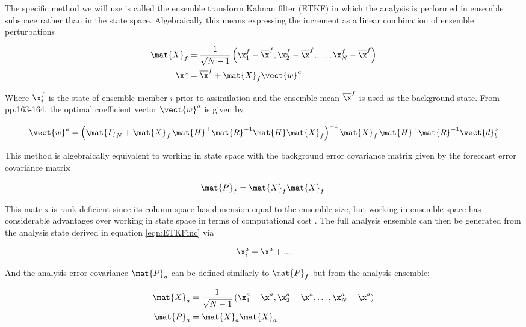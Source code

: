 The specific method we will use is called the ensemble transform Kalman filter (ETKF) in which the analysis is performed in ensemble subspace rather than in the state space. Algebraically this means expressing the increment as a linear combination of ensemble perturbations

\begin{align}
\mat{X}_f &= \frac{1}{\sqrt{N- 1}} \left( \x^f_1 - \overline{\x}^f, \x^f_2 - \overline{\x}^f, \dots, \x^f_N - \overline{\x}^f \right) \\
\x^a &= \overline{\x}^f + \mat{X}_f \vect{w}^a
\end{align}

Where $\x^f_i$ is the state of ensemble member $i$ prior to assimilation and the ensemble mean $\overline{\x}^f$ is used as the background state. From \citet{Asch2016} pp.163-164, the optimal coefficient vector $\vect{w}^a$ is given by

\begin{equation}
\vect{w}^a = \left( \mat{I}_N + \mat{X}_f^\top \mat{H}^\top \mat{R}^{-1} \mat{H} \mat{X}_f \right) ^{-1} \mat{X}_f^\top \mat{H}^\top \mat{R}^{-1} \vect{d}^o_b
\label{eqn:ETKFinc}
\end{equation}

This method is algebraically equivalent to working in state space with the background error covariance matrix given by the foreccast error covariance matrix

\begin{equation}
\mat{P}_f = \mat{X}_f \mat{X}_f^\top
\label{eqn:ferrorcov}
\end{equation}

This matrix is rank deficient since its column space has dimension equal to the ensemble size, but working in ensemble space has considerable advantages over working in state space in terms of computational cost \parencite{Hunt2007}. The full analysis ensemble can then be generated from the analysis state derived in equation \ref{eqn:ETKFinc} via

\begin{equation}
\x^a_i = \x^a + ...
\label{eqn:ETKFens}
\end{equation}

And the analysis error covariance $\mat{P}_a$ can be defined similarly to $\mat{P}_f$ but from the analysis ensemble:

\begin{align}
\mat{X}_a &= \frac{1}{\sqrt{N- 1}} \left( \x^a_1 - \x^a, \x^a_2 - \x^a, \dots, \x^a_N - \x^a \right) \\
\mat{P}_a &= \mat{X}_a \mat{X}_a^\top
\end{align}

